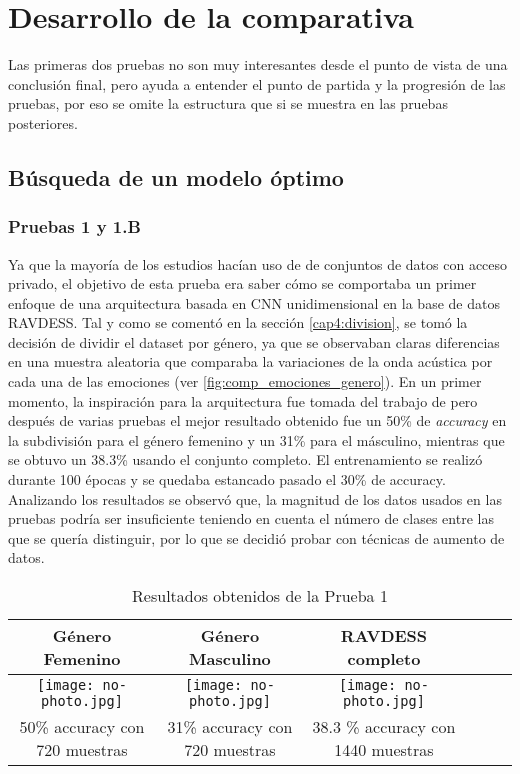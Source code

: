 \documentclass[11pt,a4paper,spanish]{book}
\begin{document}
	\chapter{Desarrollo de la comparativa}
	Las primeras dos pruebas no son muy interesantes desde el punto de vista de una conclusión final, pero ayuda a entender el punto de partida y la progresión de las pruebas, por eso se omite la estructura que si se muestra en las pruebas posteriores.
	\section{Búsqueda de un  modelo óptimo}
		\subsection{Pruebas 1 y 1.B}
		Ya que la mayoría de los estudios hacían uso de de conjuntos de datos con acceso privado, el objetivo de esta prueba era saber cómo se comportaba un primer enfoque de una arquitectura basada en CNN unidimensional en la base de datos RAVDESS. Tal y como se comentó en la sección \ref{cap4:division}, se tomó la decisión de dividir el dataset por género, ya que se observaban claras diferencias en una muestra aleatoria que comparaba la variaciones de la onda acústica por cada una de las emociones (ver \ref{fig:comp_emociones_genero}). En un primer momento, la inspiración para la arquitectura fue tomada del trabajo de \cite{blabla} pero después de varias pruebas el mejor resultado obtenido fue un 50\% de \emph{accuracy} en la subdivisión para el género femenino y un 31\% para el másculino, mientras que se obtuvo un 38.3\% usando el conjunto completo. El entrenamiento se realizó durante 100 épocas y se quedaba estancado pasado el 30\% de accuracy. Analizando los resultados se observó que, la magnitud de los datos usados en las pruebas podría ser insuficiente teniendo en cuenta el número de clases entre las que se quería distinguir, por lo que se decidió probar con técnicas de aumento de datos.
		\begin{table}[H]
			\centering
			\begin{center}
				\begin{tabular}{| c | c | c | c | c | c |}
					\hline
					Género Femenino & Género Masculino & RAVDESS completo \\ 
					\hline
					\texttt{[image: no-photo.jpg]} & \texttt{[image: no-photo.jpg]} & \texttt{[image: no-photo.jpg]}\\
					\hline
					50\% accuracy con 720 muestras & 31\%  accuracy con 720 muestras & 38.3 \% accuracy con 1440 muestras \\
					\hline	
				\end{tabular}
				\caption{Resultados obtenidos de la Prueba 1}
			\end{center}
		\end{table}
	
\end{document}

